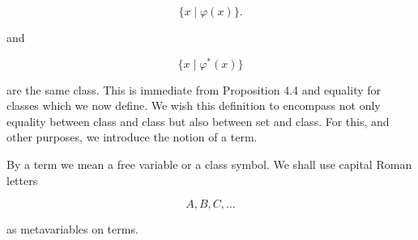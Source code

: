$$\{x \mid \varphi(x)\}.$$

and

$$\{x \mid \varphi^*(x)\}$$

are the same class. This is immediate from Proposition 4.4 and equality for classes which we now define. We wish this definition to encompass not only equality between class and class but also between set and class. For this, and other purposes, we introduce the notion of a term.

By a term we mean a free variable or a class symbol. We shall use capital Roman letters

$$A, B, C, \ldots$$

as metavariables on terms.

